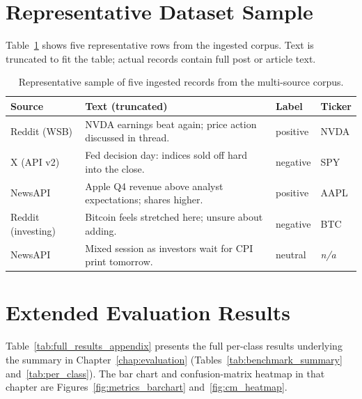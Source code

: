 \section{Representative Dataset Sample}
\label{app:dataset_sample}

Table~\ref{tab:dataset_sample} shows five representative rows from the ingested corpus. Text is truncated to fit the table; actual records contain full post or article text.

\begin{table}[!ht]
\centering
\small
\caption{Representative sample of five ingested records from the multi-source corpus.}
\label{tab:dataset_sample}
\begin{tabular}{@{}p{2.6cm} p{6.4cm} p{1.6cm} p{1.4cm}@{}}
\toprule
\textbf{Source} & \textbf{Text (truncated)} & \textbf{Label} & \textbf{Ticker} \\
\midrule
Reddit (WSB)     & NVDA earnings beat again; price action discussed in thread. & positive & NVDA \\
X (API v2)       & Fed decision day: indices sold off hard into the close.    & negative & SPY  \\
NewsAPI          & Apple Q4 revenue above analyst expectations; shares higher. & positive & AAPL \\
Reddit (investing) & Bitcoin feels stretched here; unsure about adding.        & negative & BTC  \\
NewsAPI          & Mixed session as investors wait for CPI print tomorrow.    & neutral  & \textit{n/a} \\
\bottomrule
\end{tabular}
\end{table}

\section{Extended Evaluation Results}
\label{app:extended_results}

Table~\ref{tab:full_results_appendix} presents the full per-class results underlying the summary in Chapter~\ref{chap:evaluation} (Tables~\ref{tab:benchmark_summary} and~\ref{tab:per_class}). The bar chart and confusion-matrix heatmap in that chapter are Figures~\ref{fig:metrics_barchart} and~\ref{fig:cm_heatmap}.

